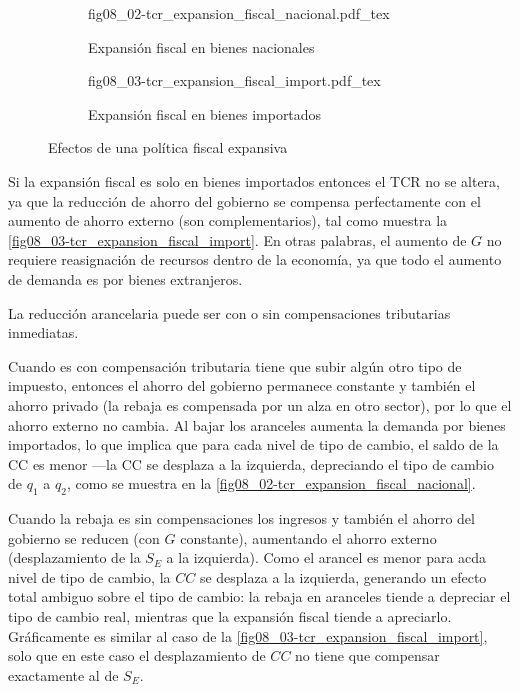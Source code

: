 \documentclass[DeGregorioResumen]{subfiles}
\begin{document}
\begin{figure}[h]
\captionsetup[subfigure]{aboveskip=20pt,belowskip=15pt}
\centering
\begin{subfigure}{.45\textwidth}
  \centering
        \def\svgwidth{\textwidth}
        {fig08_02-tcr_expansion_fiscal_nacional.pdf_tex}
  \caption{Expansión fiscal en bienes nacionales}
  \label{fig08_02-tcr_expansion_fiscal_nacional}
\end{subfigure}\hspace{.05\textwidth}
\begin{subfigure}{.45\textwidth}
  \centering
        \def\svgwidth{\textwidth}
        {fig08_03-tcr_expansion_fiscal_import.pdf_tex}
  \caption{Expansión fiscal en bienes importados}
  \label{fig08_03-tcr_expansion_fiscal_import}
\end{subfigure}
\caption{Efectos de una política fiscal expansiva}
\label{fig08_03-tcr_expansion_fiscal}
\end{figure}

Si la expansión fiscal es solo en bienes importados entonces el TCR no se altera, ya que la reducción de ahorro del gobierno se compensa perfectamente con el aumento de ahorro externo (son complementarios), tal como muestra la \autoref{fig08_03-tcr_expansion_fiscal_import}. En otras palabras, el aumento de $G$ no requiere reasignación de recursos dentro de la economía, ya que todo el aumento de demanda es por bienes extranjeros.


La reducción arancelaria puede ser con o sin compensaciones tributarias inmediatas. 

Cuando es con compensación tributaria tiene que subir algún otro tipo de impuesto, entonces el ahorro del gobierno permanece constante y también el ahorro privado (la rebaja es compensada por un alza en otro sector), por lo que el ahorro externo no cambia. Al bajar los aranceles aumenta la demanda por bienes importados, lo que implica que para cada nivel de tipo de cambio, el saldo de la CC es menor ---la CC se desplaza a la izquierda, depreciando el tipo de cambio de $q_1$ a $q_2$, como se muestra en la \autoref{fig08_02-tcr_expansion_fiscal_nacional}.

Cuando la rebaja es sin compensaciones los ingresos y también el ahorro del gobierno se reducen (con $G$ constante), aumentando el ahorro externo (desplazamiento de la $S_E$ a la izquierda). Como el arancel es menor para acda nivel de tipo de cambio, la $CC$ se desplaza a la izquierda, generando un efecto total ambiguo sobre el tipo de cambio: la rebaja en aranceles tiende a depreciar el tipo de cambio real, mientras que la expansión fiscal tiende a apreciarlo. Gráficamente es similar al caso de la \autoref{fig08_03-tcr_expansion_fiscal_import}, solo que en este caso el desplazamiento de $CC$ no tiene que compensar exactamente al de $S_E$.
\end{document}
